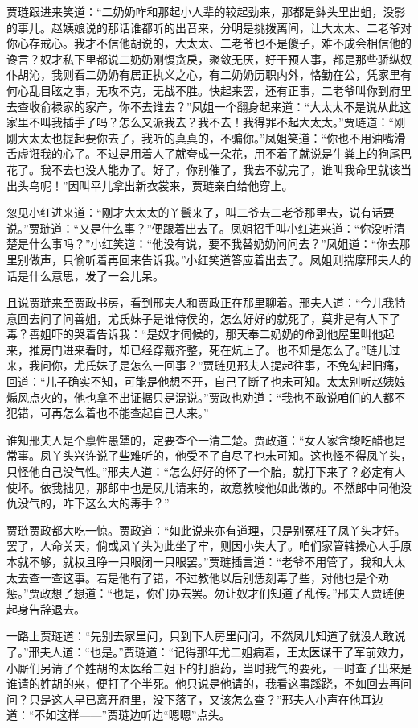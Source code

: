 \documentclass[12pt,oneside]{book}
\begin{document}
贾琏跟进来笑道：“二奶奶咋和那起小人辈的较起劲来，那都是鉢头里出蛆，没影的事儿。赵姨娘说的那话谁都听的出音来，分明是挑拨离间，让大太太、二老爷对你心存戒心。我才不信他胡说的，大太太、二老爷也不是傻子，难不成会相信他的谗言？奴才私下里都说二奶奶刚愎贪戾，聚敛无厌，好干预人事，都是那些骄纵奴仆胡沁，我则看二奶奶有居正执义之心，有二奶奶历职内外，恪勤在公，凭家里有何心乱目眩之事，无攻不克，无战不胜。快起来罢，还有正事，二老爷叫你到府里去查收俞禄家的家产，你不去谁去？”凤姐一个翻身起来道：“大太太不是说从此这家里不叫我插手了吗？怎么又派我去？我不去！我得罪不起大太太。”贾琏道：“刚刚大太太也提起要你去了，我听的真真的，不骗你。”凤姐笑道：“你也不用油嘴滑舌虚诳我的心了。不过是用着人了就夸成一朵花，用不着了就说是牛粪上的狗尾巴花了。我不去也没人能办了。好了，你别催了，我去不就完了，谁叫我命里就该当出头鸟呢！”因叫平儿拿出新衣裳来，贾琏亲自给他穿上。

忽见小红进来道：“刚才大太太的丫鬟来了，叫二爷去二老爷那里去，说有话要说。”贾琏道：“又是什么事？”便跟着出去了。凤姐招手叫小红进来道：“你没听清楚是什么事吗？”小红笑道：“他没有说，要不我替奶奶问问去？”凤姐道：“你去那里别做声，只偷听着再回来告诉我。”小红笑道答应着出去了。凤姐则揣摩邢夫人的话是什么意思，发了一会儿呆。

且说贾琏来至贾政书房，看到邢夫人和贾政正在那里聊着。邢夫人道：“今儿我特意回去问了问善姐，尤氏妹子是谁侍侯的，怎么好好的就死了，莫非是有人下了毒？善姐吓的哭着告诉我：“是奴才伺候的，那天奉二奶奶的命到他屋里叫他起来，推房门进来看时，却已经穿戴齐整，死在炕上了。也不知是怎么了。”琏儿过来，我问你，尤氏妹子是怎么一回事？”贾琏见邢夫人提起往事，不免勾起旧痛，回道：“儿子确实不知，可能是他想不开，自己了断了也未可知。太太别听赵姨娘煽风点火的，他也拿不出证据只是混说。”贾政也劝道：“我也不敢说咱们的人都不犯错，可再怎么着也不能查起自己人来。”

谁知邢夫人是个禀性愚犟的，定要查个一清二楚。贾政道：“女人家含酸吃醋也是常事。凤丫头兴许说了些难听的，他受不了自尽了也未可知。这也怪不得凤丫头，只怪他自己没气性。”邢夫人道：“怎么好好的怀了一个胎，就打下来了？必定有人使坏。依我拙见，那郎中也是凤儿请来的，故意教唆他如此做的。不然郎中同他没仇没气的，咋下这么大的毒手？”

贾琏贾政都大吃一惊。贾政道：“如此说来亦有道理，只是别冤枉了凤丫头才好。罢了，人命关天，倘或凤丫头为此坐了牢，则因小失大了。咱们家管辖操心人手原本就不够，就权且睁一只眼闭一只眼罢。”贾琏插言道：“老爷不用管了，我和大太太去查一查这事。若是他有了错，不过教他以后别恁刻毒了些，对他也是个劝惩。”贾政想了想道：“也是，你们办去罢。勿让奴才们知道了乱传。”邢夫人贾琏便起身告辞退去。

一路上贾琏道：“先别去家里问，只到下人房里问问，不然凤儿知道了就没人敢说了。”邢夫人道：“也是。”贾琏道：“记得那年尤二姐病着，王太医谋干了军前效力，小厮们另请了个姓胡的太医给二姐下的打胎药，当时我气的要死，一时查了出来是谁请的姓胡的来，便打了个半死。他只说是他请的，我看这事蹊跷，不如回去再问问？只是这人早已离开府里，没下落了，又该怎么查？”邢夫人小声在他耳边道：“不如这样——”贾琏边听边“嗯嗯”点头。
\end{document}
